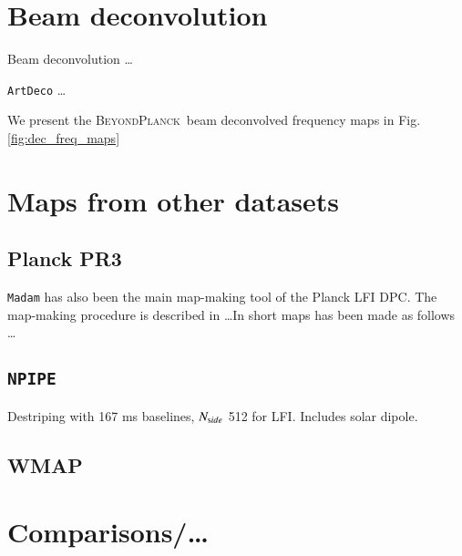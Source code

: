 \documentclass[twocolumn]{aa}
\newcommand{\BP}{\textsc{BeyondPlanck}}
\newcommand{\npipe}[0]{\texttt{NPIPE}}
\begin{document}
\section{Beam deconvolution}

Beam deconvolution \dots

{\tt ArtDeco} \dots

We present the \BP\ beam deconvolved frequency maps in Fig. \ref{fig:dec_freq_maps}

\begin{figure*}
  \caption{Beam deconvolved frequency maps for 30, 44 and 70 GHz.}\label{fig:dec_freq_maps}
\end{figure*}

\section{Maps from other datasets}

\subsection{Planck PR3}

{\tt Madam} has also been the main map-making tool of the Planck LFI DPC. The map-making procedure is described in \dots In short maps has been made as follows \dots

\subsection{\npipe}

Destriping with 167 ms baselines, $N_{\textrm side}$ 512 for LFI. Includes solar dipole.

\subsection{WMAP}





\section{Comparisons/\dots}
\end{document}
